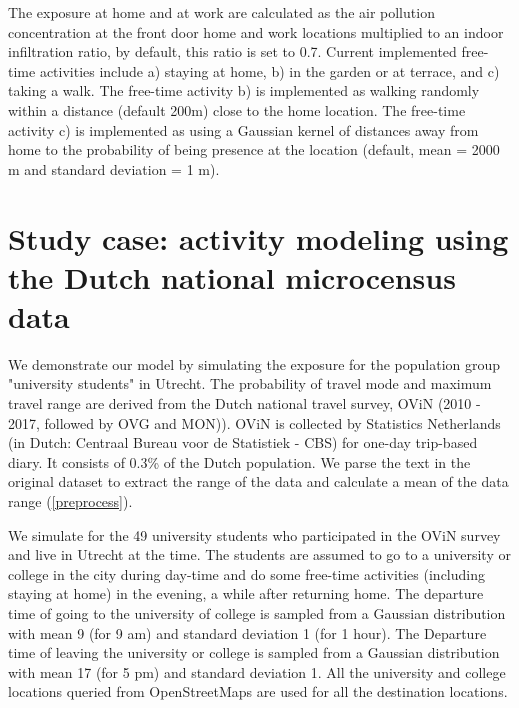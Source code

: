 \documentclass[]{article}
\begin{document}
The exposure at home and at work are calculated as the air pollution concentration at the front door home and work locations multiplied to an indoor infiltration ratio, by default, this ratio is set to 0.7. Current implemented free-time activities include a) staying at home, b) in the garden or at terrace,  and c) taking a walk. The free-time activity b) is implemented as walking randomly within a distance (default 200m) close to the home location. The free-time activity c) is implemented as using a Gaussian kernel of distances away from home to the probability of being presence at the location (default, mean = 2000 m and standard deviation = 1 m).   

\section{Study case: activity modeling using the Dutch national microcensus data}

We demonstrate our model by simulating the exposure for the population group "university students" in Utrecht. The probability of travel mode and maximum travel range are derived from the Dutch national travel survey, OViN (2010 - 2017, followed by OVG and MON)). OViN is collected by Statistics Netherlands (in Dutch: Centraal Bureau voor de Statistiek - CBS) for one-day trip-based diary. It consists of 0.3\% of the Dutch population. We parse the text in the original dataset to extract the range of the data and calculate a mean of the data range (\cref{preprocess}). 

We simulate for the 49 university students who participated in the OViN survey and live in Utrecht at the time. The students are assumed to go to a university or college in the city during day-time and do some free-time activities (including staying at home) in the evening, a while after returning home. The departure time of going to the university of college is sampled from a Gaussian distribution with mean 9 (for 9 am) and standard deviation 1 (for 1 hour). The Departure time of leaving the university or college is sampled from a Gaussian distribution with mean 17 (for 5 pm) and standard deviation 1. All the university and college locations queried from OpenStreetMaps are used for all the destination locations. 
 
 
 
 
\end{document}
